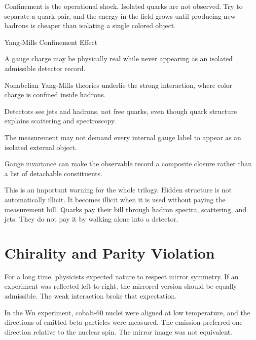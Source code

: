 Confinement is the operational shock. Isolated quarks are not observed. Try to
separate a quark pair, and the energy in the field grows until producing new
hadrons is cheaper than isolating a single colored object.

\begin{phenom}{Yang-Mills Confinement Effect}
\label{ph:yang-mills-confinement-effect}

\PhStatement A gauge charge may be physically real while never appearing as an
isolated admissible detector record.

\PhOrigin Nonabelian Yang-Mills theories underlie the strong interaction, where
color charge is confined inside hadrons.

\PhObservation Detectors see jets and hadrons, not free quarks, even though
quark structure explains scattering and spectroscopy.

\PhConstraint The measurement may not demand every internal gauge label to
appear as an isolated external object.

\PhConsequence Gauge invariance can make the observable record a composite
closure rather than a list of detachable constituents.

\end{phenom}

This is an important warning for the whole trilogy. Hidden structure is not
automatically illicit. It becomes illicit when it is used without paying the
measurement bill. Quarks pay their bill through hadron spectra, scattering, and
jets. They do not pay it by walking alone into a detector.

\section{Chirality and Parity Violation}
\label{se:chirality-and-parity-violation}

For a long time, physicists expected nature to respect mirror symmetry. If an
experiment was reflected left-to-right, the mirrored version should be equally
admissible. The weak interaction broke that expectation.

In the Wu experiment, cobalt-60 nuclei were aligned at low temperature, and the
directions of emitted beta particles were measured. The emission preferred one
direction relative to the nuclear spin. The mirror image was not equivalent.

